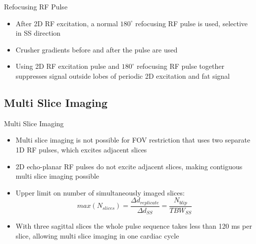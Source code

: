 \documentclass{beamer}
\begin{document}
\begin{frame}{Refocusing RF Pulse}
\begin{itemize}
	\item After 2D RF excitation, a normal $180^{\circ}$ refocusing RF pulse is used, selective in SS direction
	\item Crusher gradients before and after the pulse are used
	\item Using 2D RF excitation pulse and $180^{\circ}$ refocusing RF pulse together suppresses signal outside lobes of periodic 2D excitation and fat signal
\end{itemize}
\end{frame}

\subsection{Multi Slice Imaging}

\begin{frame}{Multi Slice Imaging}
\begin{itemize}
	\item Multi slice imaging is not possible for FOV restriction that uses two separate 1D RF pulses, which excites adjacent slices
	\item 2D echo-planar RF pulses do not excite adjacent slices, making contiguous multi slice imaging possible
	\item Upper limit on number of simultaneously imaged slices: $$max\left(N_{slices}\right)=\frac{\Delta d_{replicate}}{\Delta d_{SS}}=\frac{N_{blip}}{TBW_{SS}}$$
	\item With three sagittal slices the whole pulse sequence takes less than 120 ms per slice, allowing multi slice imaging in one cardiac cycle
\end{itemize}
\end{frame}

\end{document}
